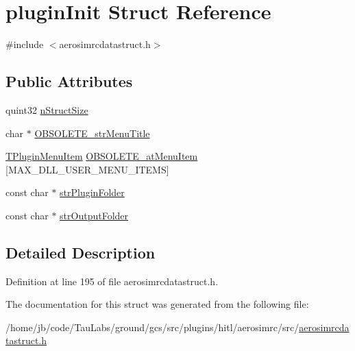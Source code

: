 \hypertarget{structplugin_init}{\section{plugin\-Init \-Struct \-Reference}
\label{structplugin_init}
}


{\ttfamily \#include $<$aerosimrcdatastruct.\-h$>$}

\subsection*{\-Public \-Attributes}
\begin{DoxyCompactItemize}
\item 
quint32 \hyperlink{group___aero_sim_r_c_ga52e8965004a5543170823fdb54bee470}{n\-Struct\-Size}
\item 
char $\ast$ \hyperlink{group___aero_sim_r_c_ga03438bb42beb3367394a89c5f8b0d721}{\-O\-B\-S\-O\-L\-E\-T\-E\-\_\-str\-Menu\-Title}
\item 
\hyperlink{struct_t_plugin_menu_item}{\-T\-Plugin\-Menu\-Item} \hyperlink{group___aero_sim_r_c_ga587ecda1e1922299d622d31bf15c9f78}{\-O\-B\-S\-O\-L\-E\-T\-E\-\_\-at\-Menu\-Item} \mbox{[}\-M\-A\-X\-\_\-\-D\-L\-L\-\_\-\-U\-S\-E\-R\-\_\-\-M\-E\-N\-U\-\_\-\-I\-T\-E\-M\-S\mbox{]}
\item 
const char $\ast$ \hyperlink{group___aero_sim_r_c_ga1ea4ae7485e88859f164a5e904600834}{str\-Plugin\-Folder}
\item 
const char $\ast$ \hyperlink{group___aero_sim_r_c_ga9149810daf40b3b4e5f706faaa8dcc8f}{str\-Output\-Folder}
\end{DoxyCompactItemize}


\subsection{\-Detailed \-Description}


\-Definition at line 195 of file aerosimrcdatastruct.\-h.



\-The documentation for this struct was generated from the following file\-:\begin{DoxyCompactItemize}
\item 
/home/jb/code/\-Tau\-Labs/ground/gcs/src/plugins/hitl/aerosimrc/src/\hyperlink{aerosimrcdatastruct_8h}{aerosimrcdatastruct.\-h}\end{DoxyCompactItemize}
